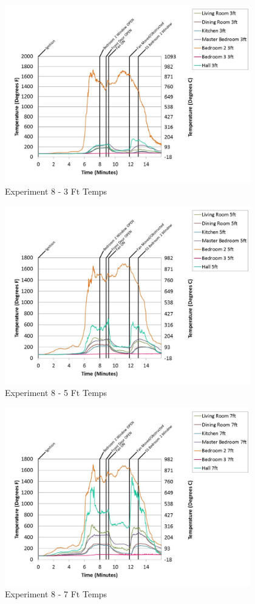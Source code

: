 \documentclass{article}
\begin{document}
\begin{appendices}
	\begin{figure}[h!]
		\centering
		\includegraphics[height=3.05in]{0_Images/Results_Charts/Exp_8_Charts/3FtTemps.pdf}
		\caption{Experiment 8 - 3 Ft Temps}
	\end{figure}
 
	\clearpage

	\begin{figure}[h!]
		\centering
		\includegraphics[height=3.05in]{0_Images/Results_Charts/Exp_8_Charts/5FtTemps.pdf}
		\caption{Experiment 8 - 5 Ft Temps}
	\end{figure}
 

	\begin{figure}[h!]
		\centering
		\includegraphics[height=3.05in]{0_Images/Results_Charts/Exp_8_Charts/7FtTemps.pdf}
		\caption{Experiment 8 - 7 Ft Temps}
	\end{figure}
 

\end{appendices}
\end{document}
